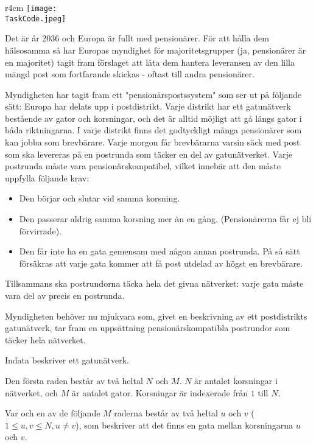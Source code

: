 \documentclass{boi2014-se}
\renewcommand{\TaskCode}{postmen}
\begin{document}
    \begin{wrapfigure}[8]{r}{4cm}
        \vspace{-18pt}
		\texttt{[image: \\TaskCode.jpeg]}
	\end{wrapfigure}
    Det är år 2036 och Europa är fullt med pensionärer. För att hålla dem
    hälsosamma så har Europas myndighet för majoritetsgrupper (ja, pensionärer
    är en majoritet) tagit fram förslaget att låta dem hantera leveransen
    av den lilla mängd post som fortfarande skickas - oftast till andra pensionärer.

    Myndigheten har tagit fram ett "pensionärspostssystem" som ser ut på följande
    sätt:
    Europa har delats upp i postdistrikt. Varje distrikt har ett gatunätverk bestående
    av gator och korsningar, och det är alltid möjligt att gå längs gator i båda riktningarna.
    I varje distrikt finns det godtyckligt många pensionärer som kan jobba som
    brevbärare. Varje morgon får brevbärarna varsin säck med post som ska levereras
    på en postrunda som täcker en del av gatunätverket. Varje postrunda måste vara
    pensionärskompatibel, vilket innebär att den måste uppfylla följande krav:

    \begin{itemize}
        \item Den börjar och slutar vid samma korsning.
        \item Den passerar aldrig samma korsning mer än en gång. (Pensionärerna får
        ej bli förvirrade).
        \item Den får inte ha en gata gemensam med någon annan postrunda. På så sätt
        försäkras att varje gata kommer att få post utdelad av högst en brevbärare.
    \end{itemize}

    Tillsammans ska postrundorna täcka hela det givna nätverket: varje gata måste
    vara del av precis en postrunda.    

    \Task
    Myndigheten behöver nu mjukvara som, givet en beskrivning av ett postdistrikts 
    gatunätverk, tar fram en uppsättning pensionärskompatibla postrundor som
    täcker hela nätverket.

    \Input
    Indata beskriver ett gatunätverk.

    Den första raden består av två heltal $N$ och $M$. $N$ är antalet korsningar
    i nätverket, och $M$ är antalet gator. Korsningar är indexerade från $1$ till $N$. 

    Var och en av de följande $M$ raderna består av två heltal $u$ och $v$ ($1 \le u, v \le N, u \neq v$),
    som beskriver att det finns en gata mellan korsningarna $u$ och $v$.
\end{document}
